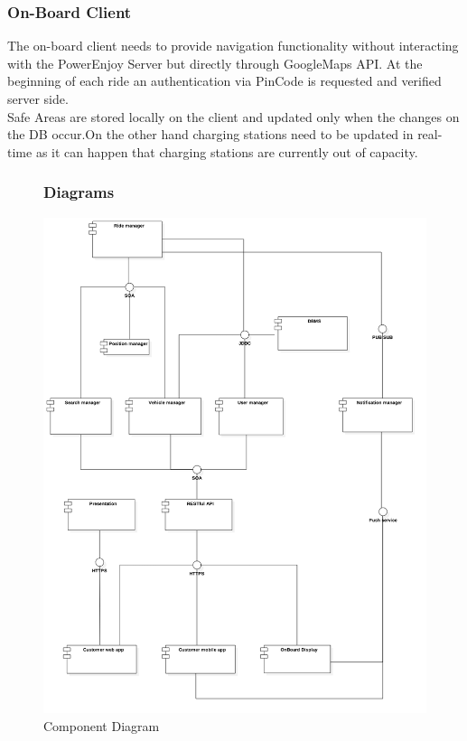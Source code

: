 \subsubsection{On-Board Client}
The on-board client needs to provide navigation functionality without interacting with the PowerEnjoy Server but directly through GoogleMaps API. At the beginning of each ride an authentication via PinCode is requested and verified server side.\\Safe Areas are stored locally on the client and updated only when the changes on the DB occur.On the other hand charging stations need to be updated in real-time as it can happen that charging stations are currently out of capacity.
\clearpage

\FloatBarrier
\begin{figure}
\subsubsection{Diagrams}
\centering
\includegraphics[scale=0.37]{Images/ComponentDiagram/ComponentDiagram.png}
\caption{Component Diagram}
\end{figure}
